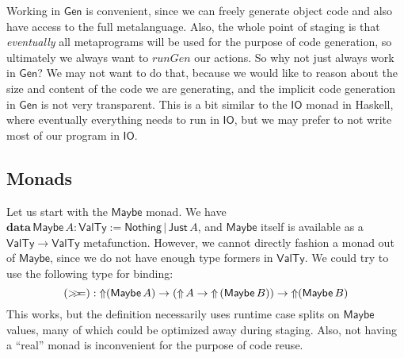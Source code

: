 \documentclass[acmsmall,screen,review,anonymous]{acmart}
\newcommand{\mit}[1]{\mathit{#1}}
\newcommand{\msf}[1]{\mathsf{#1}}
\newcommand{\mbf}[1]{\mathbf{#1}}
\newcommand{\data}{\mbf{data}\,}
\newcommand{\Up}{{\Uparrow}}
\newcommand{\bind}{\mathbin{>\!\!>\mkern-6.7mu=}}
\newcommand{\VTy}{\msf{ValTy}}
\newcommand{\Maybe}{\msf{Maybe}}
\newcommand{\Nothing}{\msf{Nothing}}
\newcommand{\Just}{\msf{Just}}
\theoremstyle{remark}
\newcommand{\Gen}{\msf{Gen}}
\newcommand{\runGen}{\mit{runGen}}
\begin{document}
Working in $\Gen$ is convenient, since we can freely generate object code and
also have access to the full metalanguage. Also, the whole point of staging is
that \emph{eventually} all metaprograms will be used for the purpose of code
generation, so ultimately we always want to $\runGen$ our actions. So why not
just always work in $\Gen$? We may not want to do that, because we would like to
reason about the size and content of the code we are generating, and the
implicit code generation in $\Gen$ is not very transparent. This is a bit
similar to the $\msf{IO}$ monad in Haskell, where eventually everything needs
to run in $\msf{IO}$, but we may prefer to not write most of our program in
$\msf{IO}$.

\subsection{Monads}\label{sec:monads}

Let us start with the $\Maybe$ monad. We have $\data \Maybe\,A : \VTy :=
\Nothing\,|\,\Just\,A$, and $\Maybe$ itself is available as a $\VTy \to \VTy$
metafunction. However, we cannot directly fashion a monad out of $\Maybe$, since
we do not have enough type formers in $\VTy$. We could try to use the following
type for binding:
\[ (\bind) : \Up(\Maybe\,A) \to (\Up\,A \to \Up\,(\Maybe\,B)) \to \Up(\Maybe\,B) \]
This works, but the definition necessarily uses runtime case splits on $\Maybe$
values, many of which could be optimized away during staging. Also, not having
a ``real'' monad is inconvenient for the purpose of code reuse.
\end{document}

